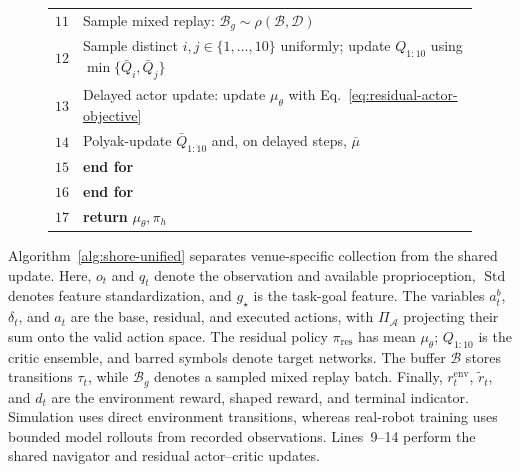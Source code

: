 \documentclass[letterpaper]{article} %
\begin{document}
\begin{figure}[t]
\begin{tabular}{@{}r@{\,\,}p{}@{}}
$11$ & \quad\quad Sample mixed replay: $\mathcal B_g\sim\rho(\mathcal B,\mathcal D)$ \\
$12$ & \quad\quad Sample distinct $i,j\in\{1,\ldots,10\}$ uniformly;\newline
\hspace*{2em}update $Q_{1:10}$ using $\min\{\bar Q_i,\bar Q_j\}$ \\
$13$ & \quad\quad Delayed actor update: update $\mu_\theta$ with Eq.~\eqref{eq:residual-actor-objective} \\
$14$ & \quad\quad Polyak-update $\bar Q_{1:10}$ and, on delayed steps, $\bar\mu$ \\
$15$ & \quad \textbf{end for} \\
$16$ & \textbf{end for} \\
$17$ & \textbf{return} $\mu_\theta,\pi_h$ \\
\bottomrule
\end{tabular}
\end{figure}

Algorithm~\ref{alg:shore-unified} separates venue-specific collection from
the shared update. Here, $o_t$ and $q_t$ denote the observation and available
proprioception, $\operatorname{Std}$ denotes feature standardization, and
$g_\star$ is the task-goal feature. The variables $a_t^b$, $\delta_t$, and
$a_t$ are the base, residual, and executed actions, with
$\Pi_{\mathcal A}$ projecting their sum onto the valid action space.
The residual policy $\pi_{\mathrm{res}}$ has mean $\mu_\theta$;
$Q_{1:10}$ is the critic ensemble, and barred symbols denote target networks.
The buffer $\mathcal B$ stores transitions $\tau_t$, while $\mathcal B_g$
denotes a sampled mixed replay batch. Finally, $r_t^{\mathrm{env}}$,
$\widetilde r_t$, and $d_t$ are the environment reward, shaped reward, and
terminal indicator. Simulation uses direct environment transitions, whereas
real-robot training uses bounded model rollouts from recorded observations.
Lines~9--14 perform the shared navigator and residual actor--critic updates.
\end{document}
